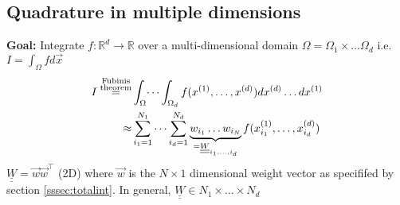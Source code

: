 \subsection{Quadrature in multiple dimensions}
    \textbf{Goal:} Integrate $f:\mathbb{R}^d\to\mathbb{R}$ over a multi-dimensional domain $\Omega = \Omega_1\times\dots\Omega_d$ i.e. $ I = \int_\Omega fd\vec{x}$
    \begin{align*}
         I \overset{\substack{\textnormal{Fubinis}\\\textnormal{theorem}}}{=}&\int_{\Omega}\dots\int_{\Omega_d}f(x^{(1)},\dots,x^{(d)})dx^{(d)}\dots dx^{(1)}\\
         \approx &\sum_{i_1=1}^{N_1}\dots\sum_{i_d=1}^{N_d} \underbrace{w_{i_1}\dots w_{i_N}}_{= \underline{\underline{W}}_{i_1,\dots,i_d}} f(x^{(1)}_{i_1},\dots, x^{(d)}_{i_d})
    \end{align*}
    $\underline{\underline{W}} = \Vec{w}\Vec{w}^\top$ (2D) where $\Vec{w}$ is the $N\times 1$ dimensional weight vector as specififed by section \ref{sssec:totalint}. In general, $\underline{\underline{W}} \in N_1\times\dots\times N_d$
    